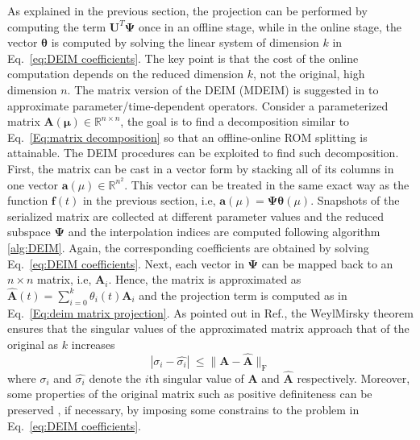 \documentclass[]{interact}
\theoremstyle{plain}%
\theoremstyle{definition}
\theoremstyle{remark}
\begin{document}
As explained in the previous section, the projection can be performed by computing the term $\mathbf{U}^T \mathbf{\Psi}$ once in an offline stage, while in the online stage, the vector $\boldsymbol{\theta}$ is computed by solving the linear system of dimension $k$ in Eq.~\ref{eq:DEIM coefficients}.
The key point is that the cost of the online computation depends on the reduced dimension $k$, not the original, high dimension $n$.
The matrix version of the DEIM (MDEIM) is suggested in \cite{carlberg2012efficient, benner2015survey} to approximate parameter/time-dependent operators.
Consider a parameterized matrix $\mathbf{A}(\boldsymbol{\mu}) \in \mathbb{R}^{n\times n}$, the goal is to find a decomposition similar to Eq.~\ref{Eq:matrix decomposition} so that an offline-online ROM splitting is attainable.
The DEIM procedures can be exploited to find such decomposition. First, the matrix can be cast in a vector form by stacking all of its columns in one vector $\mathbf{a}(\mu) \in \mathbb{R}^{n^2}$.
This vector can be treated in the same exact way as the function $\mathbf{f}(t)$ in the previous section, i.e, $\mathbf{a}(\mu) = \mathbf{\Psi}\boldsymbol{\theta}(\mu)$.
Snapshots of the serialized matrix are collected at different parameter values and the reduced subspace $\mathbf{\Psi}$ and the interpolation indices are computed following algorithm \ref{alg:DEIM}.
Again, the corresponding coefficients are obtained by solving Eq.~\ref{eq:DEIM coefficients}. 
Next, each vector in $\mathbf{\Psi}$ can be mapped back to an $n \times n$ matrix, i.e, $\textbf{A}_i$.
Hence, the matrix is approximated as $\mathbf{\hat{A}}(t)=\sum_{i=0}^k \theta_i(t) \mathbf{A}_i$ and the projection term is computed as in Eq.~\ref{Eq:deim matrix projection}.
As pointed out in Ref.\cite{negri2015efficient}, the Weyl\textendash Mirsky theorem \cite{weyl1912asymptotische} ensures that the singular values of the approximated matrix approach that of the original as $k$ increases 
\begin{equation}
	|\sigma_i - \hat{\sigma_i}  |\ \le \|\mathbf{A} - \hat{\mathbf{A}}\|_\text{F}
\end{equation}
where $\sigma_i$ and $\hat{\sigma_i}$ denote the $i$th singular value of $\mathbf{A}$ and $\hat{\mathbf{A}}$ respectively.
Moreover, some properties of the original matrix such as positive definiteness can be preserved \cite{carlberg2015preserving}, if necessary, by imposing some constrains to the problem in Eq.~\ref{eq:DEIM coefficients}.
\end{document}
